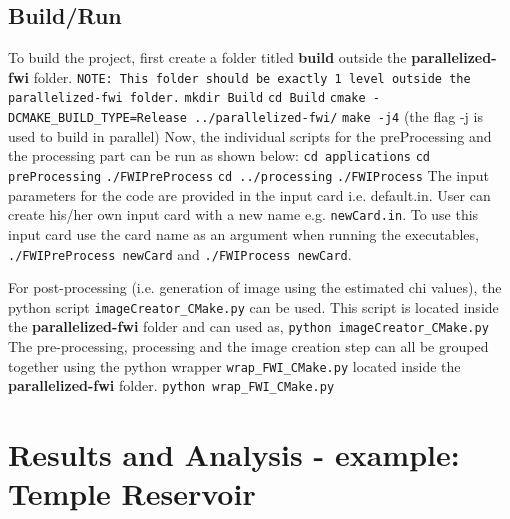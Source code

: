 \documentclass[10pt,a4paper]{article}
\begin{document}
\subsection{Build/Run}
To build the project, first create a folder titled \textbf{build} outside the \textbf{parallelized-fwi} folder.
\newline
\texttt{NOTE: This folder should be exactly 1 level outside the parallelized-fwi folder.}
\newline
\texttt{mkdir Build}
\newline
\texttt{cd Build}
\newline
\texttt{cmake -DCMAKE\_BUILD\_TYPE=Release ../parallelized-fwi/}
\newline
\texttt{make -j4} (the flag -j is used to build in parallel)
\newline
Now, the individual scripts for the preProcessing and the processing part can be run as shown below:
\newline
\texttt{cd applications}
\newline
\texttt{cd preProcessing}
\newline
\texttt{./FWIPreProcess}
\newline
\texttt{cd ../processing}
\newline
\texttt{./FWIProcess}
\newline
The input parameters for the code are provided in the input card i.e. default.in. User can create his/her own input card with a new name e.g. \texttt{newCard.in}. To use this input card use the card name as an argument when running the executables, \texttt{./FWIPreProcess newCard} and \texttt{./FWIProcess newCard}.\newline

\noindent For post-processing (i.e. generation of image using the estimated chi values), the python script \texttt{imageCreator\_CMake.py} can be used. This script is located inside the \textbf{parallelized-fwi} folder and can used as,
\newline
\texttt{python imageCreator\_CMake.py}
\newline
The pre-processing, processing and the image creation step can all be grouped together using the python wrapper \texttt{wrap\_FWI\_CMake.py} located inside the \textbf{parallelized-fwi} folder.
\newline
\texttt{python wrap\_FWI\_CMake.py}

\section{Results and Analysis - example: Temple Reservoir}
\end{document}

